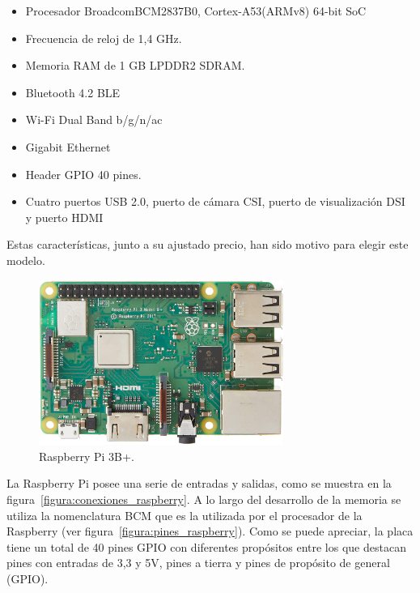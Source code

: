 \documentclass[a4paper, 12pt, oneside]{book}
\begin{document}
\begin{itemize}
	\item Procesador BroadcomBCM2837B0, Cortex-A53(ARMv8) 64-bit SoC
	
	\item Frecuencia de reloj de 1,4 GHz.
	
	\item Memoria RAM de 1 GB LPDDR2 SDRAM.
	
	\item Bluetooth 4.2 BLE

	\item Wi-Fi Dual Band b/g/n/ac
	
	\item Gigabit Ethernet
	
	\item Header GPIO 40 pines.
	
	\item Cuatro puertos USB 2.0, puerto de cámara CSI, puerto de visualización DSI y puerto HDMI
\end{itemize}

Estas características, junto a su ajustado precio, han sido motivo para elegir este modelo.

\begin{figure}[H]
	\centering
    \includegraphics[width=8cm, keepaspectratio]{img/Raspberry}
    \caption{Raspberry Pi 3B+.}
    \label{figura:raspberry}
\end{figure}

La Raspberry Pi posee una serie de entradas y salidas, como se muestra en la figura~\ref{figura:conexiones_raspberry}. A lo largo del desarrollo de la memoria se utiliza la nomenclatura BCM que es la utilizada por el procesador de la Raspberry (ver figura~\ref{figura:pines_raspberry}). Como se puede apreciar, la placa tiene un total de 40 pines GPIO con diferentes propósitos entre los que destacan pines con entradas de 3,3 y 5V, pines a tierra y pines de propósito de general (GPIO).
\end{document}
